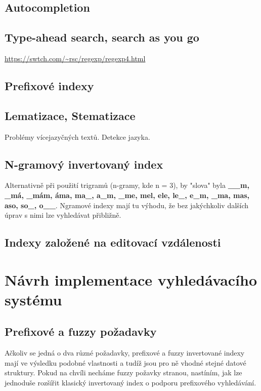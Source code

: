 \documentclass[11pt]{article}
\begin{document}
\subsection{Autocompletion}

\subsection{Type-ahead search, search as you go}

\url{https://swtch.com/~rsc/regexp/regexp4.html}
\subsection{Prefixové indexy}

\subsection{Lematizace, Stematizace}
Problémy vícejazyčných textů. Detekce jazyka.

\subsection{N-gramový invertovaný index}
Alternativně při použití trigramů (n-gramy, kde n = 3), by "slova" byla
\textbf{\_\_m, \_má, \_mám, áma, ma\_, a\_m, \_me, mel, ele, le\_, e\_m, \_ma,
mas, aso, so\_, o\_\_}. Ngramové indexy mají tu výhodu, že bez jakýchkoliv
dalších úprav s nimi lze vyhledávat přibližně. 

\subsection{Indexy založené na editovací vzdálenosti}

\section{Návrh implementace vyhledávacího systému}
\subsection{Prefixové a fuzzy požadavky}
Ačkoliv se jedná o dva různé požadavky, prefixové a fuzzy invertované indexy
mají ve výsledku podobné vlastnosti a tudíž jsou pro ně vhodné stejné datové
struktury. Pokud na chvíli necháme fuzzy požavky stranou, nastíním, jak lze
jednoduše rozšířit klasický invertovaný index o podporu prefixového
vyhledávání.
\end{document}
